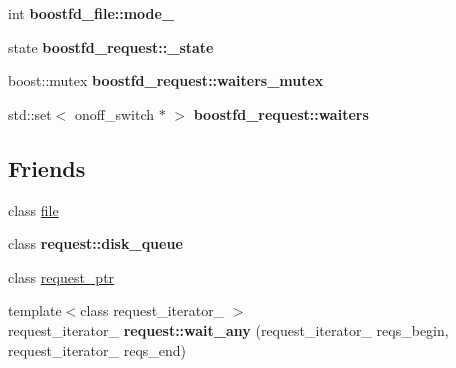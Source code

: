 \begin{CompactItemize}
\item 
\hypertarget{group__iolayer_gd7d44777fdcebf8bc76d22389c09e2d6}{
int \textbf{boostfd\_\-file::mode\_\-}}
\label{group__iolayer_gd7d44777fdcebf8bc76d22389c09e2d6}

\item 
\hypertarget{group__iolayer_g68db8fb13fe5bdb92c44af64db4b8e23}{
state \textbf{boostfd\_\-request::\_\-state}}
\label{group__iolayer_g68db8fb13fe5bdb92c44af64db4b8e23}

\item 
\hypertarget{group__iolayer_gc709fb7a7f61caa12ad0036e1d1ee8e8}{
boost::mutex \textbf{boostfd\_\-request::waiters\_\-mutex}}
\label{group__iolayer_gc709fb7a7f61caa12ad0036e1d1ee8e8}

\item 
\hypertarget{group__iolayer_g8ea60a2547e82af4ca15f3314a552d2c}{
std::set$<$ onoff\_\-switch $\ast$ $>$ \textbf{boostfd\_\-request::waiters}}
\label{group__iolayer_g8ea60a2547e82af4ca15f3314a552d2c}

\end{CompactItemize}
\subsection*{Friends}
\begin{CompactItemize}
\item 
\hypertarget{group__iolayer_g686a90482e62dd1618201a3c79f9aae6}{
class \hyperlink{group__iolayer_g686a90482e62dd1618201a3c79f9aae6}{file}}
\label{group__iolayer_g686a90482e62dd1618201a3c79f9aae6}

\item 
\hypertarget{group__iolayer_g04639cad0832bf1448ee1bb4976a05c9}{
class \textbf{request::disk\_\-queue}}
\label{group__iolayer_g04639cad0832bf1448ee1bb4976a05c9}

\item 
\hypertarget{group__iolayer_g41c8636643792c137da130157a9ca431}{
class \hyperlink{group__iolayer_g41c8636643792c137da130157a9ca431}{request\_\-ptr}}
\label{group__iolayer_g41c8636643792c137da130157a9ca431}

\item 
\hypertarget{group__iolayer_g2bfbfc0bc801311fd2933969ca786fef}{
{\footnotesize template$<$class request\_\-iterator\_\- $>$ }\\request\_\-iterator\_\- \textbf{request::wait\_\-any} (request\_\-iterator\_\- reqs\_\-begin, request\_\-iterator\_\- reqs\_\-end)}
\label{group__iolayer_g2bfbfc0bc801311fd2933969ca786fef}

\end{CompactItemize}


